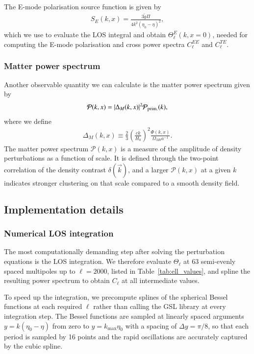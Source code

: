 \documentclass[twocolumn]{aa}
\begin{document}
The E-mode polarisation source function is given by
\begin{align*}
      S_E(k,x) = \frac{3\tilde{g}\Pi}{4k^2(\eta_0-\eta)^2},
\end{align*}
which we use to evaluate the LOS integral and obtain $\Theta^E_{\ell}(k,x=0)$, needed for computing the E-mode polarisation and cross power spectra $C_\ell^{EE}$ and $C_\ell^{TE}$.

\subsubsection{Matter power spectrum}
Another observable quantity we can calculate is the matter power spectrum given by
\begin{align*}
      \mathcal{P}(k,x) = |\Delta_M(k,x)|^2\mathcal{P}_{\rm prim.}(k),
\end{align*}
where we define
\begin{align*}
      \Delta_M(k,x) \equiv \frac{2}{3}\left(\frac{ck}{H_0}\right)^2 \frac{\Phi(k,x)}{\Omega_{M0}a^{-1}}.
\end{align*}
The matter power spectrum $\mathcal{P}(k,x)$ is a measure of the amplitude of density perturbations as a function of scale. It is defined through the two-point correlation of the density contrast $\delta(\vec{k})$, and a larger $\mathcal{P}(k,x)$ at a given $k$ indicates stronger clustering on that scale compared to a smooth density field.

\subsection{Implementation details}

\subsubsection{Numerical LOS integration}
The most computationally demanding step after solving the perturbation equations is the LOS integration. We therefore evaluate $\Theta_\ell$ at 63 semi-evenly spaced multipoles up to $\ell=2000$, listed in Table~\ref{tab:ell_values}, and spline the resulting power spectrum to obtain $C_\ell$ at all intermediate values.

To speed up the integration, we precompute splines of the spherical Bessel functions at each required $\ell$ rather than calling the GSL library at every integration step. The Bessel functions are sampled at linearly spaced arguments $y = k(\eta_0 - \eta)$ from zero to $y = k_\text{max}\eta_0$ with a spacing of $\Delta y = \pi/8$, so that each period is sampled by 16 points and the rapid oscillations are accurately captured by the cubic spline.
\end{document}
